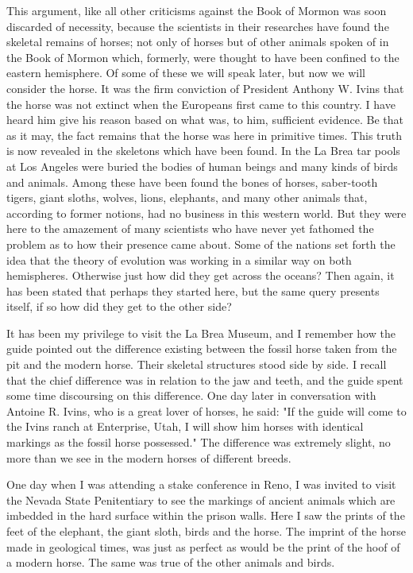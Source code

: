 This argument, like all other criticisms against the Book of Mormon was soon discarded of
necessity, because the scientists in their researches have found the skeletal remains of horses;
not only of horses but of other animals spoken of in the Book of Mormon which, formerly,
were thought to have been confined to the eastern hemisphere. Of some of these we will
speak later, but now we will consider the horse. It was the firm conviction of President
Anthony W. Ivins that the horse was not extinct when the Europeans first came to this
country. I have heard him give his reason based on what was, to him, sufficient evidence. Be
that as it may, the fact remains that the horse was here in primitive times. This truth is now
revealed in the skeletons which have been found. In the La Brea tar pools at Los Angeles
were buried the bodies of human beings and many kinds of birds and animals. Among these
have been found the bones of horses, saber-tooth tigers, giant sloths, wolves, lions, elephants,
and many other animals that, according to former notions, had no business in this western
world. But they were here to the amazement of many scientists who have never yet fathomed
the problem as to how their presence came about. Some of the nations set forth the idea that
the theory of evolution was working in a similar way on both hemispheres. Otherwise just
how did they get across the oceans? Then again, it has been stated that perhaps they started
here, but the same query presents itself, if so how did they get to the other side?

It has been my privilege to visit the La Brea Museum, and I remember how the guide pointed
out the difference existing between the fossil horse taken from the pit and the modern horse.
Their skeletal structures stood side by side. I recall that the chief difference was in relation to
the jaw and teeth, and the guide spent some time discoursing on this difference. One day later
in conversation with Antoine R. Ivins, who is a great lover of horses, he said: "If the guide
will come to the Ivins ranch at Enterprise, Utah, I will show him horses with identical
markings as the fossil horse possessed." The difference was extremely slight, no more than
we see in the modern horses of different breeds.

One day when I was attending a stake conference in Reno, I was invited to visit the Nevada
State Penitentiary to see the markings of ancient animals which are imbedded in the hard
surface within the prison walls. Here I saw the prints of the feet of the elephant, the giant
sloth, birds and the horse. The imprint of the horse made in geological times, was just as
perfect as would be the print of the hoof of a modern horse. The same was true of the other
animals and birds.

